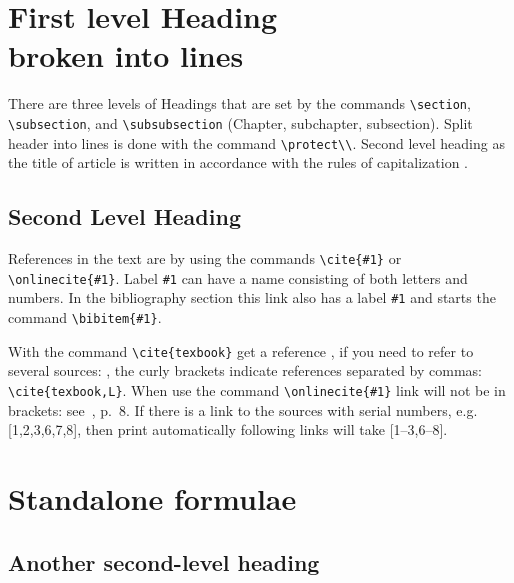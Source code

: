 \documentclass[
11pt,%
tightenlines,%
twoside,%
onecolumn,%
nofloats,%
nobibnotes,%
nofootinbib,%
superscriptaddress,%
noshowpacs,%
centertags]%
{revtex4}
\begin{document}
\section{First level Heading\protect\\
broken into lines}

There are three levels of Headings that are set by the commands
\verb|\section|, \verb|\subsection|, and \verb|\subsubsection|
(Chapter, subchapter, subsection). Split header into lines
is done with the command \verb+\protect\\+.
Second level heading as the title of article is written in accordance with the rules of capitalization \cite{cap}.

\subsection{Second Level Heading}

References in the text are by using the commands
\verb+\cite{#1}+ or \verb+\onlinecite{#1}+. Label \verb+#1+
can have a name consisting of both letters and numbers. In
the bibliography section this link also has a label \verb+#1+ and starts the command \verb+\bibitem{#1}+.

With the command \verb+\cite{texbook}+ get a reference \cite{texbook},
if you need to refer to several sources:
\cite{texbook,L}, the curly brackets indicate references
separated by commas: \verb+\cite{texbook,L}+. When
use the command \verb|\onlinecite{#1}| link will not be
in brackets: see~, p.~8.
If there is a link to the sources with serial numbers,
e.g. [1,2,3,6,7,8], then print automatically following links will take
[1--3,6--8].

\section{Standalone formulae}

\subsection{Another second-level heading}
\end{document}
